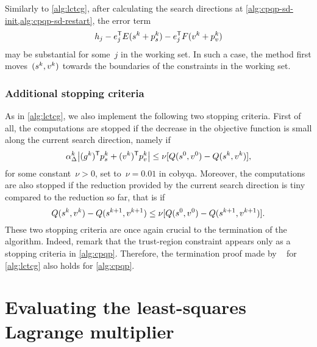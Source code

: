 Similarly to \cref{alg:lctcg}, after calculating the search directions at \cref{alg:cpqp-sd-init,alg:cpqp-sd-restart}, the error term
\begin{equation*}
    h_j - e_j^{\T} E (\sstep[k] + \pstep[k]_{\sstep}) - e_j^{\T} F (v^k + \pstep[k]_v)
\end{equation*}
may be substantial for some~$j$ in the working set.
In such a case, the method first moves~$(\sstep[k], v^k)$ towards the boundaries of the constraints in the working set.

\subsubsection{Additional stopping criteria}

As in \cref{alg:lctcg}, we also implement the following two stopping criteria.
First of all, the computations are stopped if the decrease in the objective function is small along the current search direction, namely if
\begin{equation*}
    \alpha_{\rad}^k \abs[\big]{(g^k)^{\T} \pstep[k]_{\sstep} + (v^k)^{\T} \pstep[k]_v} \le \nu [Q(\sstep[0], v^0) - Q(\sstep[k], v^k)],
\end{equation*}
for some constant~$\nu > 0$, set to~$\nu = 0.01$ in \gls{cobyqa}.
Moreover, the computations are also stopped if the reduction provided by the current search direction is tiny compared to the reduction so far, that is if
\begin{equation*}
    Q(\sstep[k], v^k) - Q(\sstep[k + 1], v^{k + 1}) \le \nu [Q(\sstep[0], v^0) - Q(\sstep[k + 1], v^{k + 1})].
\end{equation*}
These two stopping criteria are once again crucial to the termination of the algorithm.
Indeed, remark that the trust-region constraint appears only as a stopping criteria in \cref{alg:cpqp}.
Therefore, the termination proof made by \citeauthor{Powell_2009}~\cite[\S~3]{Powell_2009} for \cref{alg:lctcg} also holds for \cref{alg:cpqp}.


\section{Evaluating the least-squares Lagrange multiplier}
\label{sec:cobyqa-lagrange-multipliers}


